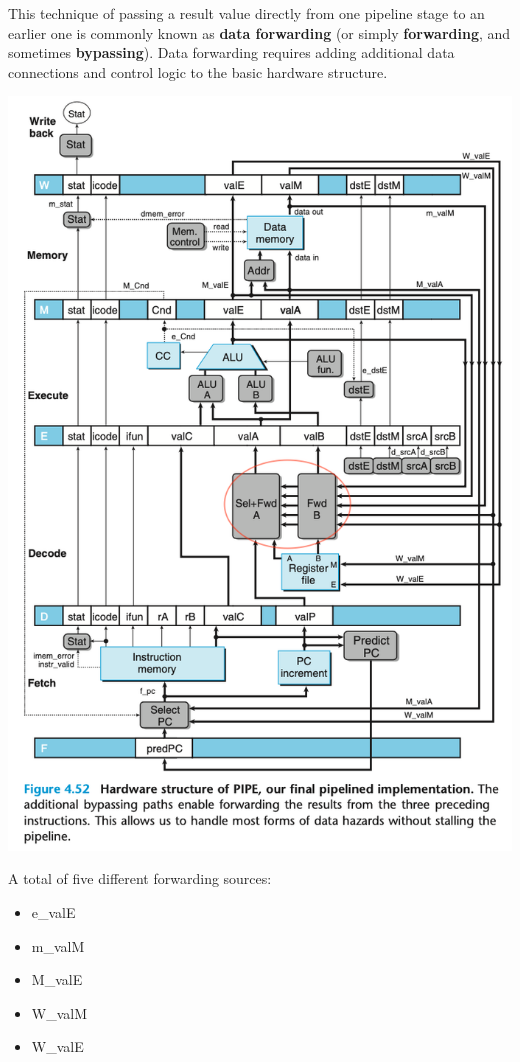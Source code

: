 \documentclass[11pt]{article}
\begin{document}
\begin{enumerate}
This technique of passing a result value directly from one pipeline stage to an earlier one is commonly known as \textbf{data forwarding} (or simply \textbf{forwarding}, and sometimes \textbf{bypassing}). Data forwarding requires adding additional data connections and control logic to the basic hardware structure.\\

\begin{center}
\includegraphics[width=.9\linewidth]{pics/figure4.52-hardware-structure-of-pipe.png}
\end{center}

A total of five different forwarding sources:\\
\begin{itemize}
\item e\_valE\\
\item m\_valM\\
\item M\_valE\\
\item W\_valM\\
\item W\_valE\\
\end{itemize}


\end{enumerate}
\end{document}
